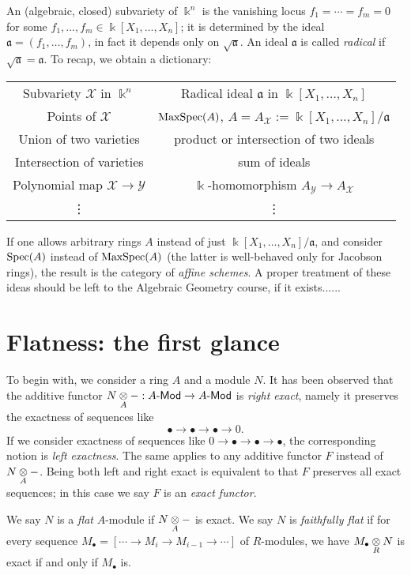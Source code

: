 An (algebraic, closed) subvariety of $\Bbbk^n$ is the vanishing locus $f_1 = \cdots = f_m = 0$ for some $f_1, \ldots, f_m \in \Bbbk[X_1, \ldots, X_n]$; it is determined by the ideal $\mathfrak{a} = (f_1, \ldots, f_m)$, in fact it depends only on $\sqrt{\mathfrak{a}}$. An ideal $\mathfrak{a}$ is called \emph{radical} if $\sqrt{\mathfrak{a}}=\mathfrak{a}$. To recap, we obtain a dictionary:
\begin{center}\begin{tabular}{c|c}
	Subvariety $\mathcal{X}$ in $\Bbbk^n$ & Radical ideal $\mathfrak{a}$ in $\Bbbk[X_1, \ldots, X_n]$ \\
	Points of $\mathcal{X}$ & $\operatorname{MaxSpec}(A)$, \;$A = A_{\mathcal{X}} := \Bbbk[X_1, \ldots, X_n]/\mathfrak{a}$ \\
	Union of two varieties & product or intersection of two ideals \\
	Intersection of varieties & sum of ideals \\
	Polynomial map $\mathcal{X} \to \mathcal{Y}$ & $\Bbbk$-homomorphism $A_{\mathcal{Y}} \to A_{\mathcal{X}}$ \\
	\vdots & \vdots
\end{tabular}\end{center}

If one allows arbitrary rings $A$ instead of just $\Bbbk[X_1, \ldots, X_n]/\mathfrak{a}$, and consider $\operatorname{Spec}(A)$ instead of $\operatorname{MaxSpec}(A)$ (the latter is well-behaved only for Jacobson rings), the result is the category of \emph{affine schemes}. A proper treatment of these ideas should be left to the Algebraic Geometry course, if it exists......

\section{Flatness: the first glance}
To begin with, we consider a ring $A$ and a module $N$. It has been observed that the additive functor $N \underset{A}{\otimes} -: A\text{-}\mathsf{Mod} \to A\text{-}\mathsf{Mod}$ is \emph{right exact}, namely it preserves the exactness of sequences like
\[ \bullet \to \bullet \to \bullet \to 0. \]
If we consider exactness of sequences like $0 \to \bullet \to \bullet \to \bullet$, the corresponding notion is \emph{left exactness}. The same applies to any additive functor $F$ instead of $N \underset{A}{\otimes} -$. Being both left and right exact is equivalent to that $F$ preserves all exact sequences; in this case we say $F$ is an \emph{exact functor}.

\begin{definition}
	We say $N$ is a \emph{flat} $A$-module if $N \underset{A}{\otimes} -$ is exact. We say $N$ is \emph{faithfully flat} if for every sequence $M_\bullet = [\cdots \to M_i \to M_{i-1} \to \cdots]$ of $R$-modules, we have $M_\bullet \underset{R}{\otimes} N$ is exact if and only if $M_\bullet$ is.
\end{definition}

